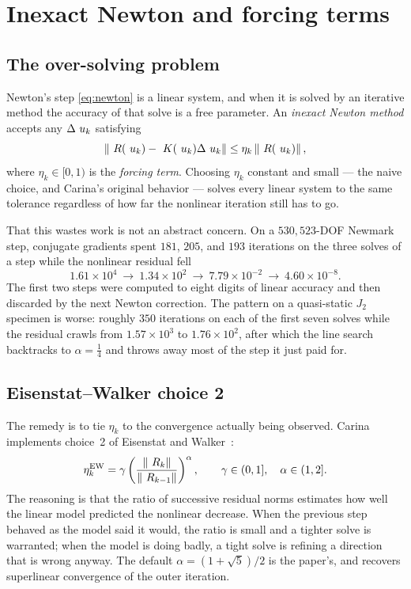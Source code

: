 \chapter{Inexact Newton and forcing terms}
\label{ch:inexact}

\section{The over-solving problem}

Newton's step \eqref{eq:newton} is a linear system, and when it is solved by an
iterative method the accuracy of that solve is a free parameter.  An
\emph{inexact Newton method} accepts any $\Delta~u_k$ satisfying
\begin{equation}
  \left\lVert ~R(~u_k) - ~K(~u_k)\Delta~u_k \right\rVert \le \eta_k \left\lVert ~R(~u_k) \right\rVert,
  \label{eq:inexact}
\end{equation}
where $\eta_k \in [0,1)$ is the \emph{forcing term}.  Choosing $\eta_k$
constant and small --- the naive choice, and Carina's original behavior ---
solves every linear system to the same tolerance regardless of how far the
nonlinear iteration still has to go.

That this wastes work is not an abstract concern.  On a $530{,}523$-DOF Newmark
step, conjugate gradients spent $181$, $205$, and $193$ iterations on the three
solves of a step while the nonlinear residual fell
\begin{equation*}
  1.61\times10^{4} \ \longrightarrow\ 1.34\times10^{2}
  \ \longrightarrow\ 7.79\times10^{-2} \ \longrightarrow\ 4.60\times10^{-8}.
\end{equation*}
The first two steps were computed to eight digits of linear accuracy and then
discarded by the next Newton correction.  The pattern on a quasi-static $J_2$
specimen is worse: roughly $350$ iterations on each of the first seven solves
while the residual crawls from $1.57\times10^3$ to $1.76\times10^2$, after
which the line search backtracks to $\alpha = \tfrac14$ and throws away most of
the step it just paid for.

\section{Eisenstat--Walker choice 2}

The remedy is to tie $\eta_k$ to the convergence actually being observed.
Carina implements choice~2 of Eisenstat and Walker~\cite{EisenstatWalker1996}:
\begin{equation}
  \eta_k^{\mathrm{EW}} = \gamma \left(\frac{\left\lVert ~R_k \right\rVert}{\left\lVert ~R_{k-1} \right\rVert}\right)^{\alpha},
  \qquad \gamma \in (0,1], \quad \alpha \in (1,2].
  \label{eq:ew}
\end{equation}
The reasoning is that the ratio of successive residual norms estimates how well
the linear model predicted the nonlinear decrease.  When the previous step
behaved as the model said it would, the ratio is small and a tighter solve is
warranted; when the model is doing badly, a tight solve is refining a direction
that is wrong anyway.  The default $\alpha = (1+\sqrt5)/2$ is the paper's, and
recovers superlinear convergence of the outer iteration.


